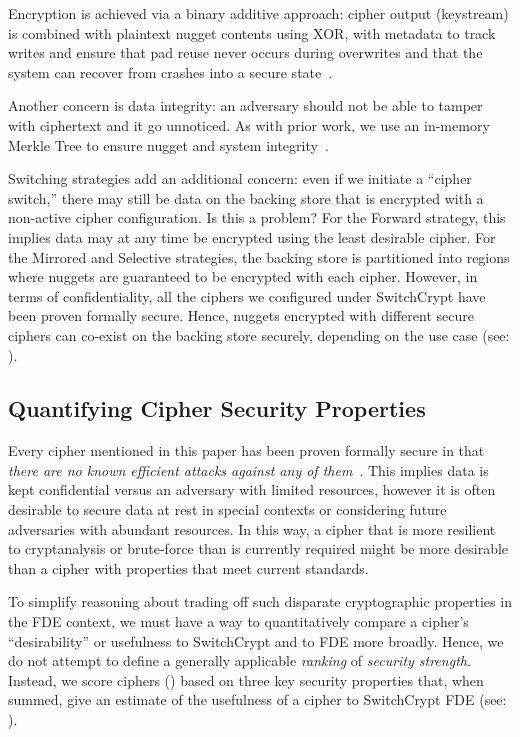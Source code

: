 Encryption is achieved via a binary additive approach: cipher output (keystream)
is combined with plaintext nugget contents using XOR, with metadata to track
writes and ensure that pad reuse never occurs during overwrites and that the
system can recover from crashes into a secure state~\cite{StrongBox}.

Another concern is data integrity: an adversary should not be able to tamper
with ciphertext and it go unnoticed. As with prior work, we use an in-memory
Merkle Tree to ensure nugget and system integrity~\cite{StrongBox}.

Switching strategies add an additional concern: even if we initiate a ``cipher
switch,'' there may still be data on the backing store that is encrypted with a
non-active cipher configuration. Is this a problem? For the Forward strategy,
this implies data may at any time be encrypted using the least desirable cipher.
For the Mirrored and Selective strategies, the backing store is partitioned into
regions where nuggets are guaranteed to be encrypted with each cipher. However,
in terms of confidentiality, all the ciphers we configured under SwitchCrypt
have been proven formally secure. Hence, nuggets encrypted with different secure
ciphers can co-exist on the backing store securely, depending on the use case
(see: ).

\subsection{Quantifying Cipher Security Properties}

Every cipher mentioned in this paper has been proven formally secure in that
\emph{there are no known efficient attacks against any of them}~\cite{All,
Ciphers, Again}. This implies data is kept confidential versus an adversary with
limited resources, however it is often desirable to secure data at rest in
special contexts or considering future adversaries with abundant resources. In
this way, a cipher that is more resilient to cryptanalysis or brute-force than
is currently required might be more desirable than a cipher with properties that
meet current standards.

To simplify reasoning about trading off such disparate cryptographic properties
in the FDE context, we must have a way to quantitatively compare a cipher's
``desirability'' or usefulness to SwitchCrypt and to FDE more broadly. Hence, we
do not attempt to define a generally applicable \textit{ranking} of
\emph{security strength}. Instead, we score ciphers () based on three key security properties that, when summed, give an
estimate of the usefulness of a cipher to SwitchCrypt FDE (see:
).

